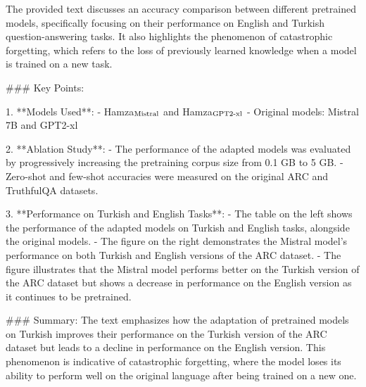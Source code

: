The provided text discusses an accuracy comparison between different pretrained models, specifically focusing on their performance on English and Turkish question-answering tasks. It also highlights the phenomenon of catastrophic forgetting, which refers to the loss of previously learned knowledge when a model is trained on a new task.

### Key Points:

1. **Models Used**:
   - Hamza\(_{\scriptsize \text{Mistral}}\) and Hamza\(_{\scriptsize \text{GPT2-xl}}\)
   - Original models: Mistral 7B and GPT2-xl

2. **Ablation Study**:
   - The performance of the adapted models was evaluated by progressively increasing the pretraining corpus size from 0.1 GB to 5 GB.
   - Zero-shot and few-shot accuracies were measured on the original ARC and TruthfulQA datasets.

3. **Performance on Turkish and English Tasks**:
   - The table on the left shows the performance of the adapted models on Turkish and English tasks, alongside the original models.
   - The figure on the right demonstrates the Mistral model's performance on both Turkish and English versions of the ARC dataset.
   - The figure illustrates that the Mistral model performs better on the Turkish version of the ARC dataset but shows a decrease in performance on the English version as it continues to be pretrained.

### Summary:
The text emphasizes how the adaptation of pretrained models on Turkish improves their performance on the Turkish version of the ARC dataset but leads to a decline in performance on the English version. This phenomenon is indicative of catastrophic forgetting, where the model loses its ability to perform well on the original language after being trained on a new one.